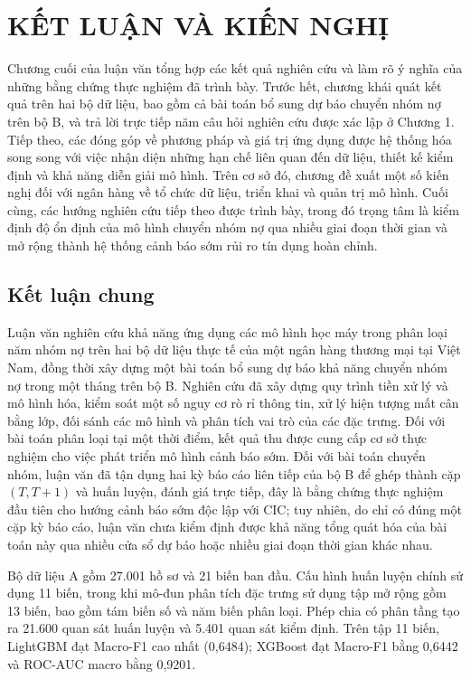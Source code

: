 \chapter{KẾT LUẬN VÀ KIẾN NGHỊ}

Chương cuối của luận văn tổng hợp các kết quả nghiên cứu và làm rõ ý nghĩa của những bằng chứng thực nghiệm đã trình bày. Trước hết, chương khái quát kết quả trên hai bộ dữ liệu, bao gồm cả bài toán bổ sung dự báo chuyển nhóm nợ trên bộ B, và trả lời trực tiếp năm câu hỏi nghiên cứu được xác lập ở Chương 1. Tiếp theo, các đóng góp về phương pháp và giá trị ứng dụng được hệ thống hóa song song với việc nhận diện những hạn chế liên quan đến dữ liệu, thiết kế kiểm định và khả năng diễn giải mô hình. Trên cơ sở đó, chương đề xuất một số kiến nghị đối với ngân hàng về tổ chức dữ liệu, triển khai và quản trị mô hình. Cuối cùng, các hướng nghiên cứu tiếp theo được trình bày, trong đó trọng tâm là kiểm định độ ổn định của mô hình chuyển nhóm nợ qua nhiều giai đoạn thời gian và mở rộng thành hệ thống cảnh báo sớm rủi ro tín dụng hoàn chỉnh.

\section{Kết luận chung}

Luận văn nghiên cứu khả năng ứng dụng các mô hình học máy trong phân loại năm nhóm nợ trên hai bộ dữ liệu thực tế của một ngân hàng thương mại tại Việt Nam, đồng thời xây dựng một bài toán bổ sung dự báo khả năng chuyển nhóm nợ trong một tháng trên bộ B. Nghiên cứu đã xây dựng quy trình tiền xử lý và mô hình hóa, kiểm soát một số nguy cơ rò rỉ thông tin, xử lý hiện tượng mất cân bằng lớp, đối sánh các mô hình và phân tích vai trò của các đặc trưng. Đối với bài toán phân loại tại một thời điểm, kết quả thu được cung cấp cơ sở thực nghiệm cho việc phát triển mô hình cảnh báo sớm. Đối với bài toán chuyển nhóm, luận văn đã tận dụng hai kỳ báo cáo liên tiếp của bộ B để ghép thành cặp $(T,T+1)$ và huấn luyện, đánh giá trực tiếp, đây là bằng chứng thực nghiệm đầu tiên cho hướng cảnh báo sớm độc lập với CIC; tuy nhiên, do chỉ có đúng một cặp kỳ báo cáo, luận văn chưa kiểm định được khả năng tổng quát hóa của bài toán này qua nhiều cửa sổ dự báo hoặc nhiều giai đoạn thời gian khác nhau.

Bộ dữ liệu A gồm 27.001 hồ sơ và 21 biến ban đầu. Cấu hình huấn luyện chính sử dụng 11 biến, trong khi mô-đun phân tích đặc trưng sử dụng tập mở rộng gồm 13 biến, bao gồm tám biến số và năm biến phân loại. Phép chia có phân tầng tạo ra 21.600 quan sát huấn luyện và 5.401 quan sát kiểm định. Trên tập 11 biến, LightGBM đạt Macro-F1 cao nhất (0,6484); XGBoost đạt Macro-F1 bằng 0,6442 và ROC-AUC macro bằng 0,9201.

